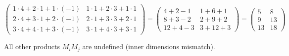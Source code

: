 \documentclass{article}
\begin{document}
\begin{itemize}
\[\begin{pmatrix}
        1 \cdot 4 + 2 \cdot 1 + 1 \cdot (-1) & 1 \cdot 1 + 2 \cdot 3 + 1 \cdot 1 \\
        2 \cdot 4 + 3 \cdot 1 + 2 \cdot (-1) & 2 \cdot 1 + 3 \cdot 3 + 2 \cdot 1 \\
        3 \cdot 4 + 4 \cdot 1 + 3 \cdot (-1) & 3 \cdot 1 + 4 \cdot 3 + 3 \cdot 1
    \end{pmatrix}
    = \begin{pmatrix}
        4 + 2 - 1 & 1 + 6 + 1 \\
        8 + 3 - 2 & 2 + 9 + 2 \\
        12 + 4 - 3 & 3 + 12 + 3
    \end{pmatrix}
    = \begin{pmatrix}
        5 & 8 \\
        9 & 13 \\
        13 & 18
    \end{pmatrix}
    \]
\end{itemize}

All other products \( M_i M_j \) are undefined (inner dimensions mismatch).
\end{document}
